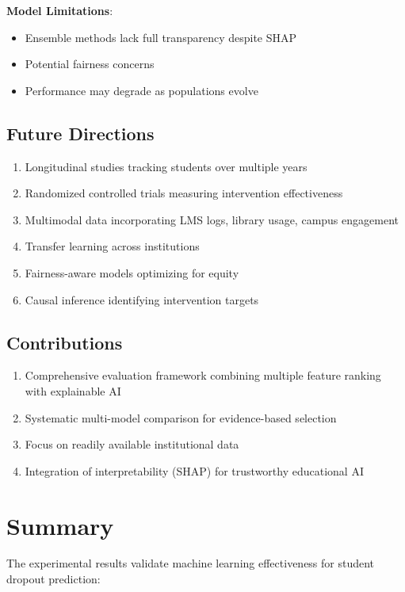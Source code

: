 \textbf{Model Limitations}:
\begin{itemize}
    \item Ensemble methods lack full transparency despite SHAP
    \item Potential fairness concerns
    \item Performance may degrade as populations evolve
\end{itemize}

\subsection{Future Directions}

\begin{enumerate}
    \item Longitudinal studies tracking students over multiple years
    \item Randomized controlled trials measuring intervention effectiveness
    \item Multimodal data incorporating LMS logs, library usage, campus engagement
    \item Transfer learning across institutions
    \item Fairness-aware models optimizing for equity
    \item Causal inference identifying intervention targets
\end{enumerate}

\subsection{Contributions}

\begin{enumerate}
    \item Comprehensive evaluation framework combining multiple feature ranking with explainable AI
    \item Systematic multi-model comparison for evidence-based selection
    \item Focus on readily available institutional data
    \item Integration of interpretability (SHAP) for trustworthy educational AI
\end{enumerate}

\section{Summary}

The experimental results validate machine learning effectiveness for student dropout prediction:


